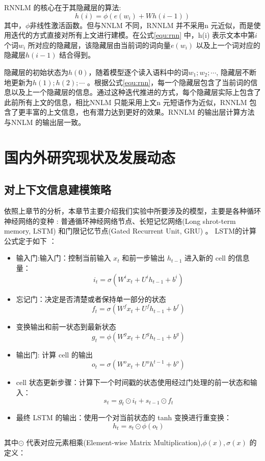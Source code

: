 \documentclass[12pt,a4paper]{article}
\begin{document}
RNNLM 的核心在于其隐藏层的算法:
\begin{equation}
\label{equ:rnn}
h(i) =\phi(e(w_i) +Wh(i -1))
\end{equation}
其中，$\phi$非线性激活函数。但与NNLM 不同，RNNLM 并不采用n 元近似，而是使用迭代的方式直接对所有上文进行建模。在公式\ref{equ:rnn} 中，h(i) 表示文本中第$i$ 个词$w_i$ 所对应的隐藏层，该隐藏层由当前词的词向量$e(w_i)$ 以及上一个词对应的隐藏层$h(i -1)$ 结合得到。

隐藏层的初始状态为$h(0)$，随着模型逐个读入语料中的词$w_1;w_2; \cdots $, 隐藏层不断地更新为$h(1);h(2); \cdots$ 。根据公式\ref{equ:rnn}，每一个隐藏层包含了当前词的信息以及上一个隐藏层的信息。通过这种迭代推进的方式，每个隐藏层实际上包含了此前所有上文的信息，相比NNLM 只能采用上文n 元短语作为近似，RNNLM 包含了更丰富的上文信息，也有潜力达到更好的效果。RNNLM 的输出层计算方法与NNLM 的输出层一致。


\section{国内外研究现状及发展动态}

\subsection{对上下文信息建模策略}
依照上章节的分析，本章节主要介绍我们实验中所要涉及的模型，主要是各种循环神经网络的变种 \cite{DBLP:conf/icml/JozefowiczZS15}: 普通循环神经网络节点、长短记忆网络(Long shrot-term memory, LSTM) \cite{DBLP:journals/taslp/SundermeyerNS15} 和门限记忆节点(Gated Recurrent Unit, GRU) \cite{DBLP:conf/nips/ChungKDGCB15}。 LSTM的计算公式定于如下 \cite{DBLP:journals/neco/HochreiterS97}：
\begin{itemize}
\item 输入门:输入门：控制当前输入 $x_t$ 和前一步输出 $h_{t−1}$ 进入新的 cell 的信息量：
$$i_t=\sigma(W^i x_t+U^i h_{t-1}+b^i)$$
\item  忘记门：决定是否清楚或者保持单一部分的状态
$$f_t=\sigma(W^f x_t+U^f h_{t-1}+b^f)$$
\item  变换输出和前一状态到最新状态
$$g_t=\phi(W^g x_t+U^g h_{t-1}+b^g)$$
\item  输出门: 计算 cell 的输出
$$o_t=\sigma(W^o x_t+U^o h^{t-1}+b^o)$$
\item  cell 状态更新步骤：计算下一个时间戳的状态使用经过门处理的前一状态和输入：
$$s_t=g_t\odot i_t+s_{t-1}\odot f_t$$
\item  最终 LSTM 的输出：使用一个对当前状态的 tanh 变换进行重变换：
$$h_t=s_t\odot \phi(o_t)$$
\end{itemize}
其中$\odot$ 代表对应元素相乘(Element-wise Matrix Multiplication),$\phi(x), \sigma(x)$ 的定义：
\end{document}
